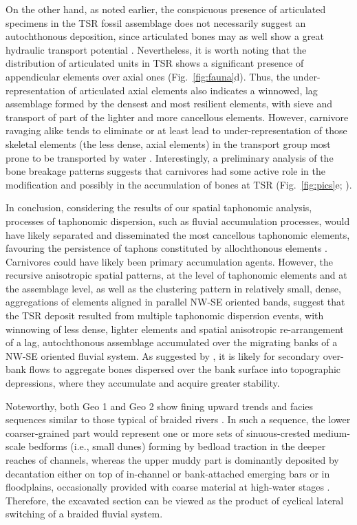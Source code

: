 \documentclass[review,times,authoryear]{elsarticle} %
\begin{document}
On the other hand, as noted earlier, the conspicuous presence of articulated specimens in the TSR fossil assemblage does not necessarily suggest an autochthonous deposition, since articulated bones may as well show a great hydraulic transport potential \citep{Coard1995,Coard1999}. Nevertheless, it is worth noting that the distribution of articulated units in TSR shows a significant presence of appendicular elements over axial ones (Fig.~\ref{fig:fauna}d). Thus, the under-representation of articulated axial elements also indicates a winnowed, lag assemblage formed by the densest and most resilient elements, with sieve and transport of part of the lighter and more cancellous elements. However, carnivore ravaging alike tends to eliminate or at least lead to under-representation of those skeletal elements (the less dense, axial elements) in the transport group most prone to be transported by water \citep{Voorhies1969,Dominguez-Rodrigo2012}. Interestingly, a preliminary analysis of the bone breakage patterns suggests that carnivores had some active role in the modification and possibly in the accumulation of bones at TSR (Fig.~\ref{fig:pics}e; \citealp{Konidaris2015}).

In conclusion, considering the results of our spatial taphonomic analysis, processes of taphonomic dispersion, such as fluvial accumulation processes, would have likely separated and disseminated the most cancellous taphonomic elements, favouring the persistence of taphons constituted by allochthonous elements \citep{Fernandez-Lopez2006}. Carnivores could have likely been primary accumulation agents. However, the recursive anisotropic spatial patterns, at the level of taphonomic elements and at the assemblage level, as well as the clustering pattern in relatively small, dense, aggregations of elements aligned in parallel NW-SE oriented bands, suggest that the TSR deposit resulted from multiple taphonomic dispersion events, with winnowing of less dense, lighter elements and spatial anisotropic re-arrangement of a lag, autochthonous assemblage accumulated over the migrating banks of a NW-SE oriented fluvial system. As suggested by \cite{Organista2017}, it is likely for secondary over-bank flows to aggregate bones dispersed over the bank surface into topographic depressions, where they accumulate and acquire greater stability.

Noteworthy, both Geo 1 and Geo 2 show fining upward trends and facies sequences similar to those typical of braided rivers \citep{Miall1977}. In such a sequence, the lower coarser-grained part would represent one or more sets of sinuous-crested medium-scale bedforms (i.e., small dunes) forming by bedload traction in the deeper reaches of channels, whereas the upper muddy part is dominantly deposited by decantation either on top of in-channel or bank-attached emerging bars or in floodplains, occasionally provided with coarse material at high-water stages \citep{Miall1982}. Therefore, the excavated section can be viewed as the product of cyclical lateral switching of a braided fluvial system.
\end{document}
